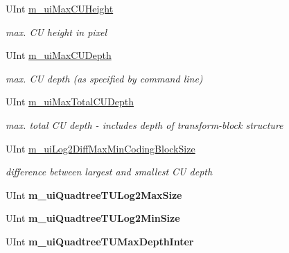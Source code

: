 \begin{DoxyCompactItemize}
U\+Int \hyperlink{class_t_app_enc_cfg_ac409a2465a2301a4df4786f434e912bb}{m\+\_\+ui\+Max\+C\+U\+Height}
\begin{DoxyCompactList}\small\item\em max. CU height in pixel \end{DoxyCompactList}\item 
\mbox{\label{class_t_app_enc_cfg_a67f36e7fcfa46732235a65ddd5dcacac}} 
U\+Int \hyperlink{class_t_app_enc_cfg_a67f36e7fcfa46732235a65ddd5dcacac}{m\+\_\+ui\+Max\+C\+U\+Depth}
\begin{DoxyCompactList}\small\item\em max. CU depth (as specified by command line) \end{DoxyCompactList}\item 
\mbox{\label{class_t_app_enc_cfg_a7b32d426733f52a26f4663aee2a39eff}} 
U\+Int \hyperlink{class_t_app_enc_cfg_a7b32d426733f52a26f4663aee2a39eff}{m\+\_\+ui\+Max\+Total\+C\+U\+Depth}
\begin{DoxyCompactList}\small\item\em max. total CU depth -\/ includes depth of transform-\/block structure \end{DoxyCompactList}\item 
\mbox{\label{class_t_app_enc_cfg_afabf2e2024b199324fd37278296c671e}} 
U\+Int \hyperlink{class_t_app_enc_cfg_afabf2e2024b199324fd37278296c671e}{m\+\_\+ui\+Log2\+Diff\+Max\+Min\+Coding\+Block\+Size}
\begin{DoxyCompactList}\small\item\em difference between largest and smallest CU depth \end{DoxyCompactList}\item 
\mbox{\label{class_t_app_enc_cfg_aa0df6873951af9831b74544b5687bee7}} 
U\+Int {\bfseries m\+\_\+ui\+Quadtree\+T\+U\+Log2\+Max\+Size}
\item 
\mbox{\label{class_t_app_enc_cfg_ab5ca0177d2557fd9db810bcab474d8e8}} 
U\+Int {\bfseries m\+\_\+ui\+Quadtree\+T\+U\+Log2\+Min\+Size}
\item 
\mbox{\label{class_t_app_enc_cfg_a5afb795c0306f148ef3928ad9859ddf4}} 
U\+Int {\bfseries m\+\_\+ui\+Quadtree\+T\+U\+Max\+Depth\+Inter}

\end{DoxyCompactItemize}
